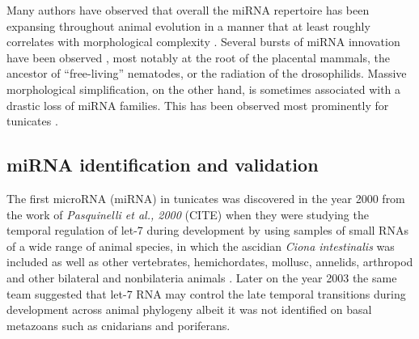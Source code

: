 \documentclass[graybox]{svmult}
\begin{document}
Many authors have observed that overall the miRNA repertoire has been
expansing throughout animal evolution in a manner that at least roughly
correlates with morphological complexity
\cite{Hertel:06a, Sempere:06, Niwa:07, Prochnik:07, Lee:07a, Heimberg:08, Peterson:09, Berezikov:11}. 
Several bursts of miRNA innovation have been observed
\cite{Hertel:06a, Heimberg:08, Tanzer:10a, Hertel:15a}, most notably at the
root of the placental mammals, the ancestor of ``free-living'' nematodes,
or the radiation of the drosophilids. Massive morphological simplification,
on the other hand, is sometimes associated with a drastic loss of miRNA
families. This has been observed most prominently for tunicates
\cite{Fu:08, Dai:09}.



\subsection{miRNA identification and validation}

The first microRNA (miRNA) in tunicates was discovered in the year 2000 from the work of \textit{Pasquinelli et al., 2000} (CITE) when they were studying the temporal regulation of let-7 during development by using samples of small RNAs of a wide range of animal species, in which the ascidian \textit{Ciona intestinalis} was included as well as other vertebrates, hemichordates, mollusc, annelids, arthropod and other bilateral and nonbilateria animals \cite{Pasquinelli2000}. Later on the year 2003 the same team suggested that let-7 RNA may control the late temporal transitions during development across animal phylogeny \cite{Pasquinelli2003} albeit it was not identified on basal metazoans such as cnidarians and poriferans. 
\end{document}
